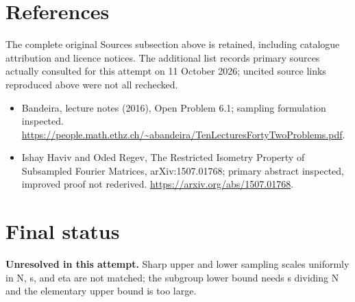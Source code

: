 \documentclass[11pt]{article}
\begin{document}
\section{References}
The complete original Sources subsection above is retained, including catalogue attribution and licence notices. The additional list records primary sources actually consulted for this attempt on 11 October 2026; uncited source links reproduced above were not all rechecked.
\begin{itemize}
\item Bandeira, lecture notes (2016), Open Problem 6.1; sampling formulation inspected. \url{https://people.math.ethz.ch/~abandeira/TenLecturesFortyTwoProblems.pdf}.
\item Ishay Haviv and Oded Regev, The Restricted Isometry Property of Subsampled Fourier Matrices, arXiv:1507.01768; primary abstract inspected, improved proof not rederived. \url{https://arxiv.org/abs/1507.01768}.
\end{itemize}
\section{Final status}
\textbf{Unresolved in this attempt.} Sharp upper and lower sampling scales uniformly in N, s, and eta are not matched; the subgroup lower bound needs s dividing N and the elementary upper bound is too large.
\end{document}
